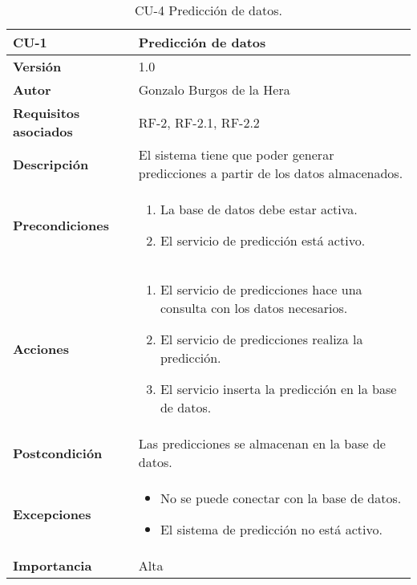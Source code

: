 \begin{table}[H]
	\centering
	\begin{tabularx}{\linewidth}{ p{} p{} }
		\toprule
		\textbf{CU-1}    & \textbf{Predicción de datos}\\
		\toprule
		\textbf{Versión}              & 1.0    \\
		\textbf{Autor}                & Gonzalo Burgos de la Hera \\
		\textbf{Requisitos asociados} & RF-2, RF-2.1, RF-2.2 \\
		\textbf{Descripción}          & El sistema tiene que poder generar predicciones a partir de los datos almacenados. \\
		\textbf{Precondiciones}       & 
        \begin{enumerate}
			\def\labelenumi{\arabic{enumi}.}
			\tightlist
			\item La base de datos debe estar activa.
			\item El servicio de predicción está activo.
		\end{enumerate}\\
		\textbf{Acciones}             &
		\begin{enumerate}
			\def\labelenumi{\arabic{enumi}.}
			\tightlist
			\item El servicio de predicciones hace una consulta con los datos necesarios.
			\item El servicio de predicciones realiza la predicción.
			\item El servicio inserta la predicción en la base de datos.
		\end{enumerate}\\
		\textbf{Postcondición}        & Las predicciones se almacenan en la base de datos. \\
		\textbf{Excepciones}          & 
        \begin{itemize}
			\tightlist
			\item No se puede conectar con la base de datos.
			\item El sistema de predicción no está activo.
        \end{itemize} \\
		\textbf{Importancia}          & Alta \\
		\bottomrule
	\end{tabularx}
	\caption{CU-4 Predicción de datos.}
\end{table}

